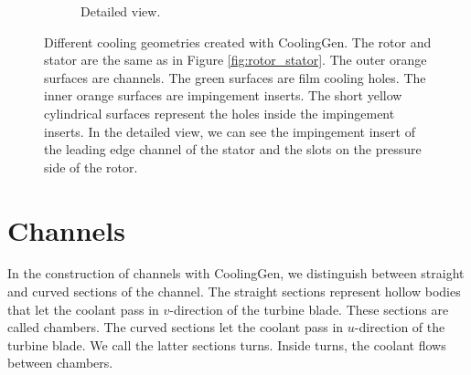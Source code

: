\documentclass[a4paper, 11pt]{report}
\theoremstyle{definition}
\begin{document}
\begin{figure}[H]
\begin{subfigure}{.49\textwidth}
			\caption{Detailed view.}
		\end{subfigure}		
		\caption{Different cooling geometries created with CoolingGen. The rotor and stator are the same as in Figure \ref{fig:rotor_stator}. The outer orange surfaces are channels. The green surfaces are film cooling holes. The inner orange surfaces are impingement inserts. The short yellow cylindrical surfaces represent the holes inside the impingement inserts. In the detailed view, we can see the impingement insert of the leading edge channel of the stator and the slots on the pressure side of the rotor.}
		\label{fig:results_complete}
	\end{figure}

\section{Channels}
	In the construction of channels with CoolingGen, we distinguish between straight and curved sections of the channel. The straight sections represent hollow bodies that let the coolant pass in $v$-direction of the turbine blade. These sections are called chambers. The curved sections let the coolant pass in $u$-direction of the turbine blade. We call the latter sections turns. Inside turns, the coolant flows between chambers.
\end{document}
